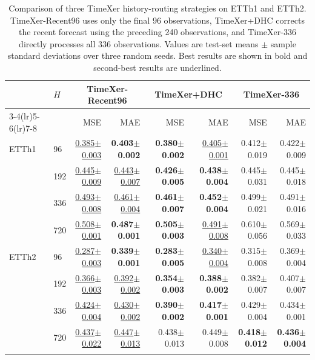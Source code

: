 \begin{table}[t]
\tablecaptionfont
\caption{Comparison of three TimeXer history-routing strategies on ETTh1 and ETTh2. TimeXer-Recent96 uses only the final 96 observations, TimeXer+DHC corrects the recent forecast using the preceding 240 observations, and TimeXer-336 directly processes all 336 observations. Values are test-set means $\pm$ sample standard deviations over three random seeds. Best results are shown in bold and second-best results are underlined.}
\label{tab:backbone-transfer-etth}
\centering
\tablebodyfont
\fontsize{7.3}{8.5}\selectfont
\setlength{\tabcolsep}{3.1pt}
\renewcommand{\arraystretch}{1.08}
\begin{tabular*}{\textwidth}{@{\extracolsep{\fill}}llrrrrrr@{}}
\toprule\noalign{}
\multirow{2}{*}{Dataset} & \multirow{2}{*}{\(H\)} & \multicolumn{2}{c}{TimeXer-Recent96} & \multicolumn{2}{c}{TimeXer+DHC} & \multicolumn{2}{c}{TimeXer-336} \\
\cmidrule(lr){3-4}\cmidrule(lr){5-6}\cmidrule(lr){7-8}
& & MSE & MAE & MSE & MAE & MSE & MAE \\
\midrule\noalign{}
ETTh1 & 96  & \underline{0.385$\pm$0.003} & \textbf{0.403$\pm$0.002} & \textbf{0.380$\pm$0.002} & \underline{0.405$\pm$0.001} & 0.412$\pm$0.019 & 0.422$\pm$0.009 \\
& 192 & \underline{0.445$\pm$0.009} & \underline{0.443$\pm$0.007} & \textbf{0.426$\pm$0.005} & \textbf{0.438$\pm$0.004} & 0.445$\pm$0.031 & 0.445$\pm$0.018 \\
& 336 & \underline{0.493$\pm$0.008} & \underline{0.461$\pm$0.004} & \textbf{0.461$\pm$0.007} & \textbf{0.452$\pm$0.004} & 0.499$\pm$0.021 & 0.491$\pm$0.016 \\
& 720 & \underline{0.508$\pm$0.001} & \textbf{0.487$\pm$0.001} & \textbf{0.505$\pm$0.003} & \underline{0.491$\pm$0.008} & 0.610$\pm$0.056 & 0.569$\pm$0.033 \\
\midrule
ETTh2 & 96  & \underline{0.287$\pm$0.003} & \textbf{0.339$\pm$0.001} & \textbf{0.283$\pm$0.005} & \underline{0.340$\pm$0.004} & 0.315$\pm$0.008 & 0.369$\pm$0.004 \\
& 192 & \underline{0.366$\pm$0.003} & \underline{0.392$\pm$0.002} & \textbf{0.354$\pm$0.003} & \textbf{0.388$\pm$0.002} & 0.382$\pm$0.007 & 0.407$\pm$0.007 \\
& 336 & \underline{0.424$\pm$0.004} & \underline{0.430$\pm$0.002} & \textbf{0.390$\pm$0.002} & \textbf{0.417$\pm$0.001} & 0.429$\pm$0.004 & 0.434$\pm$0.001 \\
& 720 & \underline{0.437$\pm$0.022} & \underline{0.447$\pm$0.013} & 0.438$\pm$0.013 & 0.449$\pm$0.008 & \textbf{0.418$\pm$0.012} & \textbf{0.436$\pm$0.004} \\
\bottomrule\noalign{}
\end{tabular*}
\end{table}

